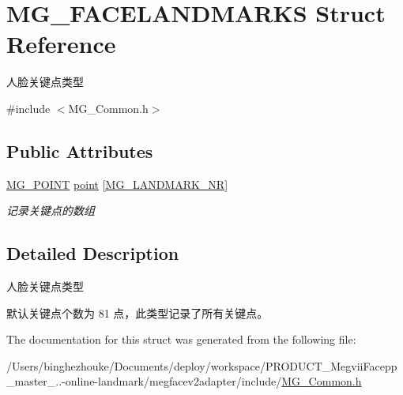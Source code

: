 \hypertarget{struct_m_g___f_a_c_e_l_a_n_d_m_a_r_k_s}{}\section{M\+G\+\_\+\+F\+A\+C\+E\+L\+A\+N\+D\+M\+A\+R\+KS Struct Reference}
\label{struct_m_g___f_a_c_e_l_a_n_d_m_a_r_k_s}


人脸关键点类型  




{\ttfamily \#include $<$M\+G\+\_\+\+Common.\+h$>$}

\subsection*{Public Attributes}
\begin{DoxyCompactItemize}
\item 
\mbox{\label{struct_m_g___f_a_c_e_l_a_n_d_m_a_r_k_s_ab6b0978643fc40c17871d3d2ca4023b1}} 
\hyperlink{struct_m_g___p_o_i_n_t}{M\+G\+\_\+\+P\+O\+I\+NT} \hyperlink{struct_m_g___f_a_c_e_l_a_n_d_m_a_r_k_s_ab6b0978643fc40c17871d3d2ca4023b1}{point} \mbox{[}\hyperlink{_m_g___common_8h_ab08016a1354ce3e4cc1a63b0ca4c7bb5}{M\+G\+\_\+\+L\+A\+N\+D\+M\+A\+R\+K\+\_\+\+NR}\mbox{]}
\begin{DoxyCompactList}\small\item\em 记录关键点的数组 \end{DoxyCompactList}\end{DoxyCompactItemize}


\subsection{Detailed Description}
人脸关键点类型 

默认关键点个数为 81 点，此类型记录了所有关键点。 

The documentation for this struct was generated from the following file\+:\begin{DoxyCompactItemize}
\item 
/\+Users/binghezhouke/\+Documents/deploy/workspace/\+P\+R\+O\+D\+U\+C\+T\+\_\+\+Megvii\+Facepp\+\_\+master\+\_..-\/online-\/landmark/megfacev2adapter/include/\hyperlink{_m_g___common_8h}{M\+G\+\_\+\+Common.\+h}\end{DoxyCompactItemize}

